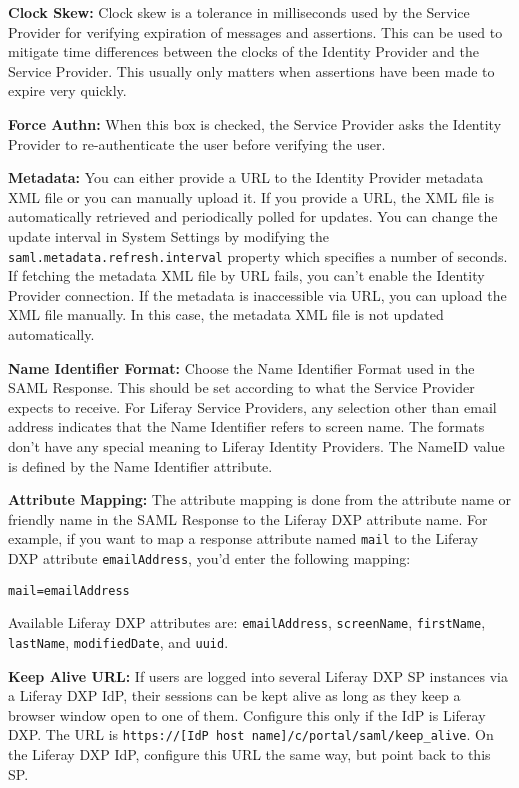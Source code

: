\textbf{Clock Skew:} Clock skew is a tolerance in milliseconds used by
the Service Provider for verifying expiration of messages and
assertions. This can be used to mitigate time differences between the
clocks of the Identity Provider and the Service Provider. This usually
only matters when assertions have been made to expire very quickly.

\textbf{Force Authn:} When this box is checked, the Service Provider
asks the Identity Provider to re-authenticate the user before verifying
the user.

\textbf{Metadata:} You can either provide a URL to the Identity Provider
metadata XML file or you can manually upload it. If you provide a URL,
the XML file is automatically retrieved and periodically polled for
updates. You can change the update interval in System Settings by
modifying the \texttt{saml.metadata.refresh.interval} property which
specifies a number of seconds. If fetching the metadata XML file by URL
fails, you can't enable the Identity Provider connection. If the
metadata is inaccessible via URL, you can upload the XML file manually.
In this case, the metadata XML file is not updated automatically.

\textbf{Name Identifier Format:} Choose the Name Identifier Format used
in the SAML Response. This should be set according to what the Service
Provider expects to receive. For Liferay Service Providers, any
selection other than email address indicates that the Name Identifier
refers to screen name. The formats don't have any special meaning to
Liferay Identity Providers. The NameID value is defined by the Name
Identifier attribute.

\textbf{Attribute Mapping:} The attribute mapping is done from the
attribute name or friendly name in the SAML Response to the Liferay DXP
attribute name. For example, if you want to map a response attribute
named \texttt{mail} to the Liferay DXP attribute \texttt{emailAddress},
you'd enter the following mapping:

\begin{verbatim}
mail=emailAddress
\end{verbatim}

Available Liferay DXP attributes are: \texttt{emailAddress},
\texttt{screenName}, \texttt{firstName}, \texttt{lastName},
\texttt{modifiedDate}, and \texttt{uuid}.

\textbf{Keep Alive URL:} If users are logged into several Liferay DXP SP
instances via a Liferay DXP IdP, their sessions can be kept alive as
long as they keep a browser window open to one of them. Configure this
only if the IdP is Liferay DXP. The URL is
\texttt{https://{[}IdP\ host\ name{]}/c/portal/saml/keep\_alive}. On the
Liferay DXP IdP, configure this URL the same way, but point back to this
SP.

